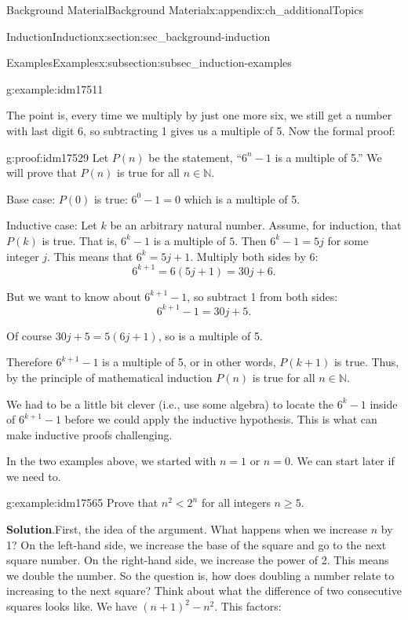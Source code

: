 \documentclass[oneside,10pt,]{book}
\numberwithin{equation}{chapter}
\def\N{\mathbb N}
\newcommand{\lt}{<}
\begin{document}
\begin{appendixptx}{Background Material}{}{Background Material}{}{}{x:appendix:ch_additionalTopics}
\begin{sectionptx}{Induction}{}{Induction}{}{}{x:section:sec_background-induction}
\begin{subsectionptx}{Examples}{}{Examples}{}{}{x:subsection:subsec_induction-examples}
\begin{example}{}{g:example:idm17511}
\par
The point is, every time we multiply by just one more six, we still get a number with last digit 6, so subtracting 1 gives us a multiple of 5. Now the formal proof:%
\begin{proofptx}{}{g:proof:idm17529}
Let \(P(n)\) be the statement, ``\(6^n - 1\) is a multiple of 5.'' We will prove that \(P(n)\) is true for all \(n \in \N\).%
\par
Base case: \(P(0)\) is true: \(6^0 -1 = 0\) which is a multiple of 5.%
\par
Inductive case: Let \(k\) be an arbitrary natural number. Assume, for induction, that \(P(k)\) is true. That is, \(6^k - 1\) is a multiple of \(5\). Then \(6^k - 1 = 5j\) for some integer \(j\). This means that \(6^k = 5j + 1\). Multiply both sides by \(6\):%
\begin{equation*}
6^{k+1} = 6(5j+1) = 30j + 6.
\end{equation*}
%
\par
But we want to know about \(6^{k+1} - 1\), so subtract 1 from both sides:%
\begin{equation*}
6^{k+1} - 1 = 30j + 5.
\end{equation*}
%
\par
Of course \(30j+5 = 5(6j+1)\), so is a multiple of 5.%
\par
Therefore \(6^{k+1} - 1\) is a multiple of 5, or in other words, \(P(k+1)\) is true. Thus, by the principle of mathematical induction \(P(n)\) is true for all \(n \in \N\).%
\end{proofptx}
\end{example}
We had to be a little bit clever (i.e., use some algebra) to locate the \(6^k - 1\) inside of \(6^{k+1} - 1\) before we could apply the inductive hypothesis. This is what can make inductive proofs challenging.%
\par
In the two examples above, we started with \(n = 1\) or \(n = 0\). We can start later if we need to.%
\begin{example}{}{g:example:idm17565}%
Prove that \(n^2 \lt  2^n\) for all integers \(n \ge 5\).%
\par\smallskip%
\noindent\textbf{Solution}.\hypertarget{g:solution:idm17570}{}\quad{}First, the idea of the argument. What happens when we increase \(n\) by 1? On the left-hand side, we increase the base of the square and go to the next square number. On the right-hand side, we increase the power of 2. This means we double the number. So the question is, how does doubling a number relate to increasing to the next square? Think about what the difference of two consecutive squares looks like. We have \((n+1)^2 - n^2\). This factors:%

\end{example}
\end{subsectionptx}
\end{sectionptx}
\end{appendixptx}
\end{document}
